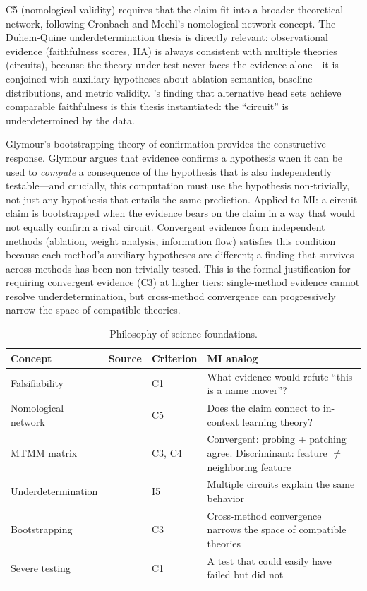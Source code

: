 \documentclass{article}
\begin{document}
C5 (nomological validity) requires that the claim fit into a broader theoretical network, following Cronbach and Meehl's nomological network concept. The Duhem-Quine underdetermination thesis \citep{quine1951two, duhem1906theorie} is directly relevant: observational evidence (faithfulness scores, IIA) is always consistent with multiple theories (circuits), because the theory under test never faces the evidence alone---it is conjoined with auxiliary hypotheses about ablation semantics, baseline distributions, and metric validity. \citet{meloux2025everything}'s finding that alternative head sets achieve comparable faithfulness is this thesis instantiated: the ``circuit'' is underdetermined by the data.

Glymour's bootstrapping theory of confirmation \citep{glymour1980theory} provides the constructive response. Glymour argues that evidence confirms a hypothesis when it can be used to \emph{compute} a consequence of the hypothesis that is also independently testable---and crucially, this computation must use the hypothesis non-trivially, not just any hypothesis that entails the same prediction. Applied to MI: a circuit claim is bootstrapped when the evidence bears on the claim in a way that would not equally confirm a rival circuit. Convergent evidence from independent methods (ablation, weight analysis, information flow) satisfies this condition because each method's auxiliary hypotheses are different; a finding that survives across methods has been non-trivially tested. This is the formal justification for requiring convergent evidence (C3) at higher tiers: single-method evidence cannot resolve underdetermination, but cross-method convergence can progressively narrow the space of compatible theories.

\begin{table}[H]
\centering\small
\caption{Philosophy of science foundations.}
\renewcommand{\arraystretch}{1.12}
\begin{tabular}{@{}l>{\raggedright\arraybackslash}p{2cm}l>{\raggedright\arraybackslash}p{4.5cm}@{}}
\toprule
\textbf{Concept} & \textbf{Source} & \textbf{Criterion} & \textbf{MI analog} \\
\midrule
Falsifiability & \citet{popper1959logic} & C1 & What evidence would refute ``this is a name mover''? \\
\midrule
Nomological network & \citet{cronbach1955construct} & C5 & Does the claim connect to in-context learning theory? \\
\midrule
MTMM matrix & \citet{campbell1959convergent} & C3, C4 & Convergent: probing + patching agree. Discriminant: feature $\neq$ neighboring feature \\
\midrule
Underdetermination & \citet{quine1951two, duhem1906theorie} & I5 & Multiple circuits explain the same behavior \\
\midrule
Bootstrapping & \citet{glymour1980theory} & C3 & Cross-method convergence narrows the space of compatible theories \\
\midrule
Severe testing & \citet{mayo2018statistical} & C1 & A test that could easily have failed but did not \\
\bottomrule
\end{tabular}
\end{table}
\end{document}
